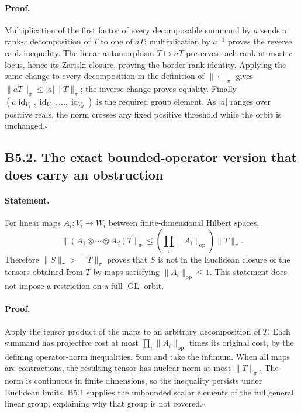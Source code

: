 \documentclass[11pt,a4paper]{article}
\begin{document}
\paragraph{Proof.}
Multiplication of the first factor of every decomposable summand by
$a$ sends a rank-$r$ decomposition of $T$ to one of $aT$; multiplication
by $a^{-1}$ proves the reverse rank inequality.  The linear
automorphism $T\mapsto aT$ preserves each rank-at-most-$r$ locus, hence
its Zariski closure, proving the border-rank identity.  Applying the
same change to every decomposition in the definition of $\|\cdot\|_\pi$
gives $\|aT\|_\pi\leq|a|\|T\|_\pi$; the inverse change proves
equality.  Finally $(a\operatorname{id}_{V_1},\operatorname{id}_{V_2},
\ldots,\operatorname{id}_{V_d})$ is the required group element.
As $|a|$ ranges over positive reals, the norm crosses any fixed positive
threshold while the orbit is unchanged.\hfill$\square$

\subsection*{B5.2. The exact bounded-operator version that does carry an obstruction}
\paragraph{Statement.}
For linear maps $A_i:V_i\to W_i$ between finite-dimensional Hilbert
spaces,
\[
 \|(A_1\otimes\cdots\otimes A_d)T\|_\pi
 \leq\left(\prod_i\|A_i\|_{\mathrm{op}}\right)\|T\|_\pi.
\]
Therefore $\|S\|_\pi>\|T\|_\pi$ proves that $S$ is not in the
Euclidean closure of the tensors obtained from $T$ by maps satisfying
$\|A_i\|_{\mathrm{op}}\leq1$.  This statement does not impose a
restriction on a full $\operatorname{GL}$ orbit.
\paragraph{Proof.}
Apply the tensor product of the maps to an arbitrary decomposition of
$T$.  Each summand has projective cost at most
$\prod_i\|A_i\|_{\mathrm{op}}$ times its original cost, by the
defining operator-norm inequalities.  Sum and take the infimum.
When all maps are contractions, the resulting tensor has nuclear norm
at most $\|T\|_\pi$.  The norm is continuous in finite dimensions, so
the inequality persists under Euclidean limits.  B5.1 supplies the
unbounded scalar elements of the full general linear group, explaining
why that group is not covered.\hfill$\square$
\end{document}
